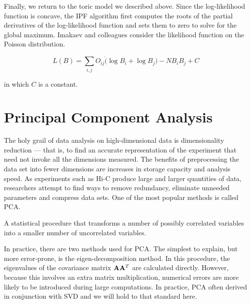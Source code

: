 Finally, we return to the \gls{toric model} we described above.  Since the log-likelihood function is concave, the \gls{IPF} algorithm first
computes the roots of the partial derivatives of the log-likelihood function and sets them to zero to solve for the global maximum.  Imakaev
and colleagues consider the likelihood function on the Poisson distribution.

\[
  L(B) = \sum_{i,j}O_{ij} \dot (\log{B_i} + \log{B_j}) - NB_{i}B_{j} + C
\]

in which $C$ is a constant.


\section*{Principal Component Analysis}

The holy grail of data analysis on high-dimensional data is dimensionality reduction --- that is, to find an accurate representation of
the experiment that need not invoke all the dimensions measured.  The benefits of preprocessing the data set into fewer dimensions are
increases in storage capacity and analysis speed.  As experiments such as Hi-C produce large and larger quantities of data, researchers
attempt to find ways to remove redundancy, eliminate unneeded parameters and compress data sets.  One of the most popular methods is
called \gls{PCA}\cite{law1987}.

\begin{defn}
  A statistical procedure that transforms a number of possibly correlated variables into a smaller number of uncorrelated variables.
\end{defn}

In practice, there are two methods used for \gls{PCA}.  The simplest to explain, but more error-prone, is the eigen-decomposition
method\cite{}.  In this procedure, the eigenvalues of the covariance matrix $\mathbf{A}\mathbf{A}^T$ are calculated directly.  However,
because this involves an extra matrix multiplication, numerical errors are more likely to be introduced during large computations.
In practice, \gls{PCA} often derived in conjunction with \gls{SVD} and we will hold to that standard here.

